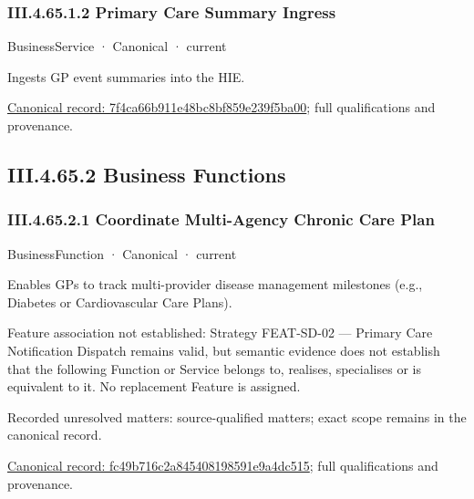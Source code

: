 \subsubsection*{III.4.65.1.2 Primary Care Summary Ingress}
\label{navigation:III.4.65.1.2}

\label{element:7f4ca66b911e48bc8bf859e239f5ba00}
{\small BusinessService · Canonical · current}\par

Ingests GP event summaries into the HIE.


{\footnotesize \href{../../../../continuum/business/business-service/7f4ca66b911e48bc8bf859e239f5ba00.md}{Canonical record: 7f4ca66b911e48bc8bf859e239f5ba00}; full qualifications and provenance.}\par
\subsection*{III.4.65.2 Business Functions}
\label{navigation:III.4.65.2}

\subsubsection*{III.4.65.2.1 Coordinate Multi-Agency Chronic Care Plan}
\label{navigation:III.4.65.2.1}

\label{element:fc49b716c2a845408198591e9a4dc515}
{\small BusinessFunction · Canonical · current}\par

Enables GPs to track multi-provider disease management milestones (e.g., Diabetes or Cardiovascular Care Plans).



Feature association not established: Strategy FEAT-SD-02 — Primary Care Notification Dispatch remains valid, but semantic evidence does not establish that the following Function or Service belongs to, realises, specialises or is equivalent to it. No replacement Feature is assigned.


{\small Recorded unresolved matters: source-qualified matters; exact scope remains in the canonical record.}\par
{\footnotesize \href{../../../../continuum/business/business-function/fc49b716c2a845408198591e9a4dc515.md}{Canonical record: fc49b716c2a845408198591e9a4dc515}; full qualifications and provenance.}\par
